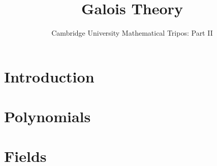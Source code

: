 \documentclass{article}
\title{Galois Theory}
\author{Cambridge University Mathematical Tripos: Part II}
\begin{document}
\maketitle

\tableofcontentsnewpage{}

\section{Introduction}

\section{Polynomials}

\section{Fields}

\end{document}
